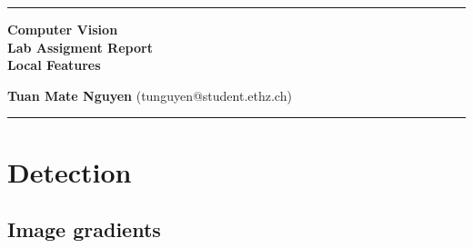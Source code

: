\documentclass[10pt,a4paper,twoside]{article}
\begin{document}
\begin{center}
\hrule

\vspace{.4cm}
{\bf {\Huge Computer Vision} \\ {\huge Lab Assigment Report} \\ {\Large Local Features}}
\vspace{.2cm}
\end{center}
{\bf Tuan Mate Nguyen}  (tunguyen@student.ethz.ch)
\hrule



\section{Detection}
\subsection{Image gradients}


\end{document}
